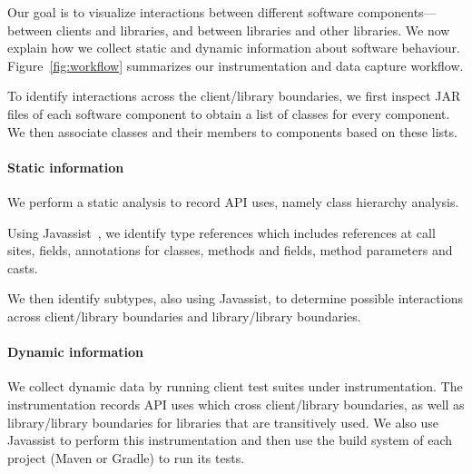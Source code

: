 \label{sec:collecting-data}
Our goal is to visualize interactions between different software components---between
clients and libraries, and between libraries and other libraries. We now explain
how we collect static and dynamic information about software behaviour.
Figure~\ref{fig:workflow} summarizes our instrumentation and
data capture workflow. 

To identify interactions across the client/library boundaries,
we first inspect JAR files of each software component to obtain a list of
classes for every component. We then associate classes and their members to
components based on these lists.

\paragraph{Static information} We perform a static analysis to record
API uses, namely class hierarchy analysis. 

Using Javassist~\cite{chiba00:_load_struc_reflec_java}, we identify type
references which includes references at call sites, fields, annotations for 
classes, methods and fields, method parameters and casts. 

We then identify subtypes, also using Javassist, to determine possible 
interactions across client/library boundaries and library/library boundaries.

\paragraph{Dynamic information} We collect dynamic data by running client
test suites under instrumentation. 
The instrumentation records API
uses which cross client/library boundaries, as well as library/library boundaries
for libraries that are transitively used. We also use
Javassist to perform this
instrumentation and then use the build system of each project (Maven or Gradle) to run its
tests. 

